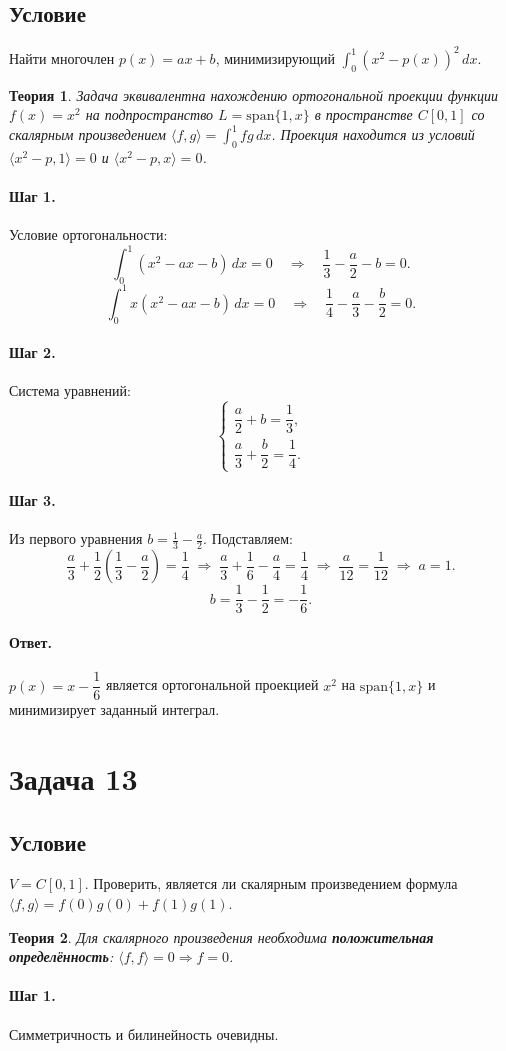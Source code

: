 \documentclass[12pt,a4paper]{article}
\theoremstyle{solution}
\newtheorem*{theory}{Теория}
\newcommand{\task}[1]{\newpage\section*{Задача #1}}
\newcommand{\answer}{\paragraph{Ответ.}}
\newcommand{\step}[1]{\paragraph{Шаг #1.}}
\begin{document}
\subsection*{Условие}
Найти многочлен $p(x)=ax+b$, минимизирующий $\displaystyle\int_0^1(x^2-p(x))^2\,dx$.

\begin{theory}
Задача эквивалентна нахождению ортогональной проекции функции $f(x)=x^2$ на подпространство $L=\mathrm{span}\{1,x\}$ в пространстве $C[0,1]$ со скалярным произведением $\langle f,g\rangle=\int_0^1 fg\,dx$. Проекция находится из условий $\langle x^2-p,1\rangle=0$ и $\langle x^2-p,x\rangle=0$.
\end{theory}

\step{1} Условие ортогональности:
\[
\int_0^1(x^2-ax-b)\,dx=0\quad\Rightarrow\quad\frac{1}{3}-\frac{a}{2}-b=0.
\]
\[
\int_0^1 x(x^2-ax-b)\,dx=0\quad\Rightarrow\quad\frac{1}{4}-\frac{a}{3}-\frac{b}{2}=0.
\]

\step{2} Система уравнений:
\[
\begin{cases}\dfrac{a}{2}+b=\dfrac{1}{3},\\[6pt]\dfrac{a}{3}+\dfrac{b}{2}=\dfrac{1}{4}.\end{cases}
\]

\step{3} Из первого уравнения $b=\frac{1}{3}-\frac{a}{2}$. Подставляем:
\[
\frac{a}{3}+\frac{1}{2}\!\left(\frac{1}{3}-\frac{a}{2}\right)=\frac{1}{4}
\;\Rightarrow\;\frac{a}{3}+\frac{1}{6}-\frac{a}{4}=\frac{1}{4}
\;\Rightarrow\;\frac{a}{12}=\frac{1}{12}\;\Rightarrow\;a=1.
\]
\[
b=\frac{1}{3}-\frac{1}{2}=-\frac{1}{6}.
\]

\answer $p(x)=x-\dfrac{1}{6}$ является ортогональной проекцией $x^2$ на $\mathrm{span}\{1,x\}$ и минимизирует заданный интеграл.

\task{13}
\subsection*{Условие}
$V=C[0,1]$. Проверить, является ли скалярным произведением формула $\langle f,g\rangle=f(0)g(0)+f(1)g(1)$.

\begin{theory}
Для скалярного произведения необходима \textbf{положительная определённость}: $\langle f,f\rangle=0\Rightarrow f=0$.
\end{theory}

\step{1} Симметричность и билинейность очевидны.
\end{document}
